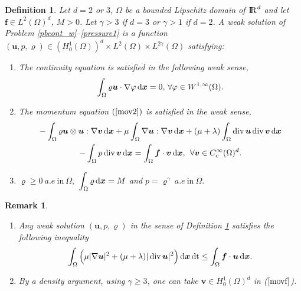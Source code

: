 \documentclass{amsart}
\newtheorem{rmq}{Remark}
\newtheorem{df}{Definition}
\numberwithin{equation}{section}
\begin{document}
\begin{df}\label{ldeuxw}Let $d= 2$ or $3$, $\Omega$ be a bounded Lipschitz domain of $ {\ifmmode{\rm	I\mkern-3.1mu
R\mkern1mu}\else{\rm I\kern-.18em 
R\hskip1pt\	}\fi\relax}^d$ and let  $\bm{f} \in L^2(\Omega)^d$, $M >0$. Let $ \gamma >3 $ if $d=3$ or $\gamma>1$ if $d=2$.
A  weak solution of Problem \eqref{pbcont_w}--\eqref{pressure1} is a function
$({{\boldsymbol u}},p,{\varrho})  \in  (H^1_0(\Omega))^d \times L^2(\Omega) \times L^{2\gamma}(\Omega)$ satisfying:
\begin{enumerate}
\item The continuity equation  is satisfied in the following weak sense,
\begin{equation}\label{contf}
	\int_\Omega  {\varrho} {\bm{u}} \cdot \nabla \varphi {\, {\rm d}{{\boldsymbol x}}}= 0, \,  \forall \varphi \in W^{1,\infty} ( \Omega).
\end{equation}
\item   The momentum equation $(\ref{mov2}) $ is satisfied in the weak sense,\begin{multline}\label{movf}
	- \int_\Omega {\varrho} {\bm{u}} \otimes {\bm{u}} : \nabla {\bm{v}} {\, {\rm d}{{\boldsymbol x}}} +\mu \int_\Omega \nabla {\bm{u}} : \nabla {\bm{v}} {\, {\rm d}{{\boldsymbol x}}}  +(\mu +\lambda)\int_\Omega \operatorname{div} {\bm{u}} \operatorname{div} {\bm{v}} {\, {\rm d}{{\boldsymbol x}}} \\
 -\int_\Omega p \operatorname{div} {\bm{v}} {\, {\rm d}{{\boldsymbol x}}} = \int_\Omega \bm{f} \cdot {\bm{v}} {\, {\rm d}{{\boldsymbol x}}}, \;  \, \forall {\bm{v}} \in C_c^\infty(\Omega)^d.
\end{multline}
\item  ${\varrho} \ge 0 ~a.e ~\text{in}~ \Omega,$ $\displaystyle \int_\Omega  {\varrho} {\, {\rm d}{{\boldsymbol x}}} =M$ and $ p = {\varrho}^\gamma ~a.e ~\text{in}~ \Omega.$ \label{eosf} 
\end{enumerate}
\end{df}

\begin{rmq}
\begin{enumerate}
\item
Any weak solution $({\bm{u}},p,{\varrho})$ in the sense of Definition \ref{ldeuxw} satisfies the following inequality 
\begin{equation}\label{ienergief}
\int_\Omega\Big( \mu| \nabla {\bm{u}} |^2 +(\mu+\lambda)|\operatorname{div} {\bm{u}}|^2\Big) {\, {\rm d}{{\boldsymbol x}}}\operatorname{dt}\le \int_\Omega \bm{f} \cdot {\bm{u}} {\, {\rm d}{{\boldsymbol x}}}.
\end{equation} 
\item By a density argument, using ${\gamma} \ge 3$, one can take $ {\bm{v}} \in H_0^1(\Omega)^d$ in ($\ref{movf}$).
\end{enumerate}
\end{rmq}
\end{document}
